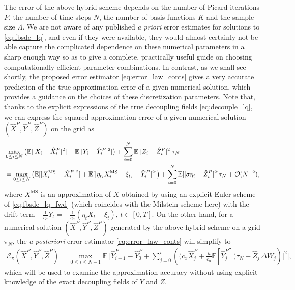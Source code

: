\documentclass[11pt]{article}
\numberwithin{equation}{section}
\theoremstyle{definition}
\theoremstyle{remark}
\def\cE{\mathcal{E}}
\def\sE{{\mathbb{E}}}
\begin{document}
% 
 The error of the above hybrid scheme depends on the number of Picard iterations $P$, the number of time steps $N$, the number of basis functions $K$ and the sample size $\Lambda$. We are not aware of any published \emph{a priori} error estimates for solutions to \eqref{eq:fbsde_lq}, and even if they were available, they would almost certainly not be able capture the complicated dependence on these numerical parameters in a sharp enough way so as to give a complete, practically useful guide on choosing computationally efficient parameter combinations. 
 In contrast,  as we shall see shortly, 
 the proposed error estimator \eqref{eq:error_law_conts} gives a very accurate prediction of the true approximation error of a given numerical solution,
 which provides a guidance on the choices of these discretization parameters.
Note that, thanks to the explicit expressions of the true decoupling fields \eqref{eq:decouple_lq}, 
we can express the squared approximation error of a given numerical solution $(\hat{X}^P,\hat{Y}^P,\hat{Z}^P)$
on the grid as
\begin{align}
& \max_{0 \leq i \leq N} 
\big( \mathbb{E}[|X_{i}-\hat{X}^{P}_i|^2] + \mathbb{E}[|Y_{i}-\hat{Y}^{P}_i|^2]
\big) + \sum_{i=0}^{N}   \mathbb{E}[|Z_{i}-\hat{Z}^{P}_i|^2] \tau_N 
\nonumber\\
& = \max_{0 \leq i \leq N} \big( \mathbb{E}[|X^{\textrm{MS}}_{i}-\hat{X}^{P}_i|^2] + \mathbb{E}[|\eta_{t_i}X^{\textrm{MS}}_{i} + \xi_{t_i} -\hat{Y}^{P}_i|^2]\big) + \sum_{i=0}^{N}  \mathbb{E}[|\sigma \eta_i-\hat{Z}^{P}_i|^2]\tau_N + \mathcal{O}(N^{-2}),
\label{eq:TrueError}
\end{align} 
where $X^{\textrm{MS}}$ is an approximation of $X$  obtained by using an explicit Euler scheme 
of \eqref{eq:fbsde_lq_fwd}
(which coincides  with the Milstein scheme here)
with the drift term $ -\frac{1}{c_{\alpha}} Y_t=-\frac{1}{c_{\alpha}} (\eta_tX_t + \xi_t)$, $t\in [0,T]$.  
On the other hand, 
for a numerical solution $(\hat{X}^P,\hat{Y}^P,\hat{Z}^P)$
generated by the above hybrid scheme on a grid $\pi_N$,
the \textit{a posteriori} error estimator \eqref{eq:error_law_conts}
will simplify to 
\begin{align}\label{eq:errorEstimate} 
\cE_\pi(\hat{X}^{P},\hat{Y}^{P},\hat{Z}^{P}) = \max_{0\le i\le N-1}
\sE\bigg[
\bigg|
\hat{Y}^{P}_{i+1}-\hat{Y}^{P}_0
+\sum_{j=0}^{i}
\left(
\bigg( c_x \hat{X}^P_j+ \frac{\bar{h}}{c_{\alpha}}\mathbb{E}[\hat{Y}^{P}_j] \bigg)\tau_N- \hat{Z}_j\,\Delta W_j
\right)
\bigg|^2
\bigg],
\end{align}   
which will
 be used to examine the approximation accuracy without using explicit knowledge of the exact decoupling fields of $Y$ and $Z$. 
\end{document}
